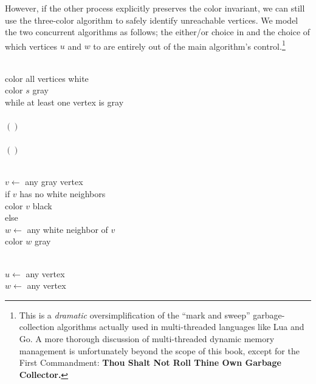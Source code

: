 \begin{exercises}
\begin{enumerate}
However, if the other process explicitly preserves the color invariant, we can still use the three-color algorithm to safely identify unreachable vertices.
We model the two concurrent algorithms as follows; the either/or choice in  and the choice of which vertices $u$ and $w$ to  are entirely out of the main algorithm’s control.\footnote{This is a \textit{dramatic} oversimplification of the “mark and sweep” garbage-collection algorithms actually used in multi-threaded languages like Lua and Go. A more thorough discussion of multi-threaded dynamic memory management is unfortunately beyond the scope of this book, except for the First Commandment: \textbf{Thou Shalt Not Roll Thine Own Garbage Collector.}}
\begin{center}
\begin{minipage}[c]{0.51\linewidth}
\begin{pseudocode}
\\
color all vertices white\\
color $s$ gray\\
while at least one vertex is gray\\
\Indent \mbox{\color{JEred}{\bfseries either}}\\
\Indent\Indent {}$()$\\
\Indent \mbox{\color{JEred}{\bfseries or}}\\
\Indent\Indent \mbox{\color{JEred}$()$}
\end{pseudocode}
\end{minipage}\hfill
\begin{minipage}[c]{0.47\linewidth}
\begin{pseudocode}
\\
$v \gets$ any gray vertex\\
if $v$ has no white neighbors\\
\Indent color $v$ black\\
else\\
\Indent $w \gets$ any white neighbor of $v$\\
\Indent color $w$ gray
\end{pseudocode}
\end{minipage}
\end{center}
\begin{pseudocode}
\\
$u \gets$ any vertex\\
$w \gets$ any vertex\\

\end{pseudocode}
\end{enumerate}
\end{exercises}
